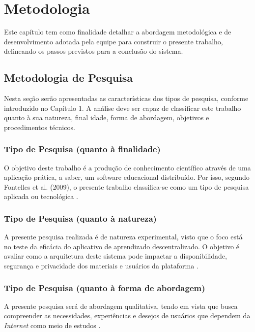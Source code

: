 \chapter[Metodologia]{Metodologia}

Este capítulo tem como finalidade detalhar a abordagem metodológica e de desenvolvimento adotada pela equipe para construir o presente trabalho, delineando os passos previstos para a conclusão do sistema.

\section{Metodologia de Pesquisa}

Nesta seção serão apresentadas as características dos tipos de pesquisa, conforme introduzido no Capítulo 1. A análise deve ser capaz de classificar este trabalho quanto à sua natureza, final idade, forma de abordagem, objetivos e procedimentos técnicos.

\subsection{Tipo de Pesquisa (quanto à finalidade)}
O objetivo deste trabalho é a produção de conhecimento científico através de uma aplicação prática, a saber, um software educacional distribuído. Por isso, segundo Fontelles et al. (2009), o presente trabalho classifica-se como um tipo de pesquisa aplicada ou tecnológica \cite{fontelles2009}.

\subsection{Tipo de Pesquisa (quanto à natureza)}
A presente pesquisa realizada é de natureza experimental, visto que o foco está no teste da eficácia do aplicativo de aprendizado descentralizado. O objetivo é avaliar como a arquitetura deste sistema pode impactar a disponibilidade, segurança e privacidade dos materiais e usuários da plataforma \cite{fontelles2009}.

\subsection{Tipo de Pesquisa (quanto à forma de abordagem)}
A presente pesquisa será de abordagem qualitativa, tendo em vista que busca compreender as necessidades, experiências e desejos de usuários que dependem da \textit{Internet} como meio de estudos \cite{fontelles2009}.

